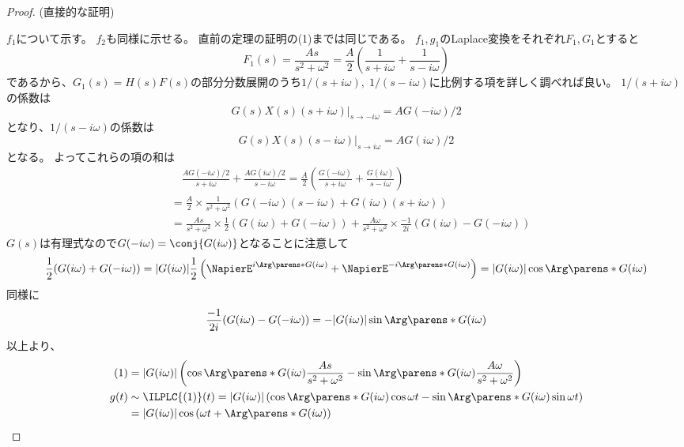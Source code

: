 			\begin{proof}
				(直接的な証明)
				\quad\par
				$f_1$について示す。
				$f_2$も同様に示せる。
				直前の定理の証明の(1)までは同じである。
				$f_1,g_1$のLaplace変換をそれぞれ$F_1,G_1$とすると
				\[ F_1(s) = \frac{As}{s^2+\omega^2} = \frac{A}{2}\left(\frac{1}{s+i\omega} + \frac{1}{s-i\omega}\right) \]
				であるから、$G_1(s) = H(s)F(s)$の部分分数展開のうち$1/(s+i\omega),\;1/(s-i\omega)$に比例する項を詳しく調べれば良い。
				$1/(s+i\omega)$の係数は
				\[ \left. G(s)X(s)(s+i\omega) \right|_{s\to-i\omega} = AG(-i\omega)/2\]
				となり、$1/(s-i\omega)$の係数は
				\[ \left. G(s)X(s)(s-i\omega) \right|_{s\to i\omega} = AG(i\omega)/2\]
				となる。
				よってこれらの項の和は
				\begin{align}
					&\quad \frac{AG(-i\omega)/2}{s+i\omega} + \frac{AG(i\omega)/2}{s-i\omega} = \frac{A}{2}\left(\frac{G(-i\omega)}{s+i\omega} + \frac{G(i\omega)}{s-i\omega}\right) \nonumber\\
					&= \frac{A}{2}\times\frac{1}{s^2+\omega^2}\left(G(-i\omega)(s-i\omega) + G(i\omega)(s+i\omega)\right) \nonumber\\
					&= \frac{As}{s^2+\omega^2}\times\frac{1}{2}(G(i\omega)+G(-i\omega)) + \frac{A\omega}{s^2+\omega^2}\times\frac{-1}{2i}(G(i\omega)-G(-i\omega))
				\end{align}
				$G(s)$は有理式なので$G(-i\omega) = \conj{G(i\omega)}$となることに注意して
				\[ \frac{1}{2}(G(i\omega)+G(-i\omega)) = |G(i\omega)|\frac{1}{2}\left(\NapierE^{i\Arg\parens*{G(i\omega)}} + \NapierE^{-i\Arg\parens*{G(i\omega)}}\right) = |G(i\omega)|\cos\Arg\parens*{G(i\omega)} \]
				同様に
				\[ \frac{-1}{2i}(G(i\omega)-G(-i\omega)) = -|G(i\omega)|\sin\Arg\parens*{G(i\omega)} \]
				以上より、
				\begin{align*}
					(1) &= |G(i\omega)|\left(\cos\Arg\parens*{G(i\omega)}\frac{As}{s^2+\omega^2} - \sin\Arg\parens*{G(i\omega)}\frac{A\omega}{s^2+\omega^2} \right) \\
					g(t) &\sim \ILPLC{(1)}(t) = |G(i\omega)|\left(\cos\Arg\parens*{G(i\omega)}\cos\omega t - \sin\Arg\parens*{G(i\omega)}\sin\omega t \right) \\
					&= |G(i\omega)|\cos\left(\omega t + \Arg\parens*{G(i\omega)}\right)
				\end{align*}
			\end{proof}